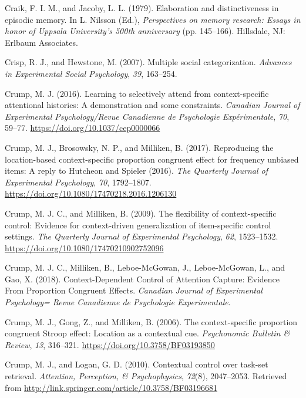 \documentclass[]{DissertateCUNY}
\begin{document}
\leavevmode\hypertarget{ref-craik_elaboration_1979}{}%
Craik, F. I. M., and Jacoby, L. L. (1979). Elaboration and
distinctiveness in episodic memory. In L. Nilsson (Ed.),
\emph{Perspectives on memory research: Essays in honor of Uppsala
University's 500th anniversary} (pp. 145--166). Hillsdale, NJ: Erlbaum
Associates.

\leavevmode\hypertarget{ref-crisp_multiple_2007}{}%
Crisp, R. J., and Hewstone, M. (2007). Multiple social categorization.
\emph{Advances in Experimental Social Psychology}, \emph{39}, 163--254.

\leavevmode\hypertarget{ref-crump_learning_2016}{}%
Crump, M. J. (2016). Learning to selectively attend from
context-specific attentional histories: A demonstration and some
constraints. \emph{Canadian Journal of Experimental Psychology/Revue
Canadienne de Psychologie Expérimentale}, \emph{70}, 59--77.
\url{https://doi.org/10.1037/cep0000066}

\leavevmode\hypertarget{ref-crump_reproducing_2017}{}%
Crump, M. J., Brosowsky, N. P., and Milliken, B. (2017). Reproducing the
location-based context-specific proportion congruent effect for
frequency unbiased items: A reply to Hutcheon and Spieler (2016).
\emph{The Quarterly Journal of Experimental Psychology}, \emph{70},
1792--1807. \url{https://doi.org/10.1080/17470218.2016.1206130}

\leavevmode\hypertarget{ref-crump_flexibility_2009}{}%
Crump, M. J. C., and Milliken, B. (2009). The flexibility of
context-specific control: Evidence for context-driven generalization of
item-specific control settings. \emph{The Quarterly Journal of
Experimental Psychology}, \emph{62}, 1523--1532.
\url{https://doi.org/10.1080/17470210902752096}

\leavevmode\hypertarget{ref-crump_context-dependent_2018}{}%
Crump, M. J. C., Milliken, B., Leboe-McGowan, J., Leboe-McGowan, L., and
Gao, X. (2018). Context-Dependent Control of Attention Capture: Evidence
From Proportion Congruent Effects. \emph{Canadian Journal of
Experimental Psychology= Revue Canadienne de Psychologie Experimentale}.

\leavevmode\hypertarget{ref-crump_context-specific_2006}{}%
Crump, M. J., Gong, Z., and Milliken, B. (2006). The context-specific
proportion congruent Stroop effect: Location as a contextual cue.
\emph{Psychonomic Bulletin \& Review}, \emph{13}, 316--321.
\url{https://doi.org/10.3758/BF03193850}

\leavevmode\hypertarget{ref-crump_contextual_2010}{}%
Crump, M. J., and Logan, G. D. (2010). Contextual control over task-set
retrieval. \emph{Attention, Perception, \& Psychophysics}, \emph{72}(8),
2047--2053. Retrieved from
\url{http://link.springer.com/article/10.3758/BF03196681}
\end{document}
